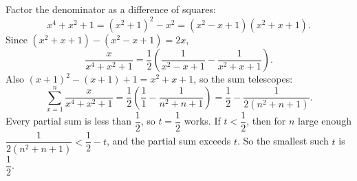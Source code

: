 Factor the denominator as a difference of squares:
\[x^4+x^2+1=\left(x^2+1\right)^2-x^2=\left(x^2-x+1\right)\left(x^2+x+1\right).\]
Since $\left(x^2+x+1\right)-\left(x^2-x+1\right)=2x$,
\[\dfrac{x}{x^4+x^2+1}=\dfrac{1}{2}\left(\dfrac{1}{x^2-x+1}-\dfrac{1}{x^2+x+1}\right).\]
Also $(x+1)^2-(x+1)+1=x^2+x+1$, so the sum telescopes:
\[\sum_{x=1}^{n}\dfrac{x}{x^4+x^2+1}=\dfrac{1}{2}\left(\dfrac{1}{1}-\dfrac{1}{n^2+n+1}\right)=\dfrac{1}{2}-\dfrac{1}{2\left(n^2+n+1\right)}.\]
Every partial sum is less than $\dfrac{1}{2}$, so $t=\dfrac{1}{2}$ works. If $t<\dfrac{1}{2}$, then for $n$ large enough $\dfrac{1}{2(n^2+n+1)}<\dfrac{1}{2}-t$, and the partial sum exceeds $t$. So the smallest such $t$ is $\boxed{\dfrac{1}{2}}$.
